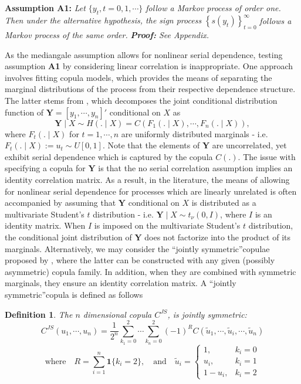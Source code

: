 \documentclass[harvard,11pt]{article}
\newtheorem{definition}{Definition}
\begin{document}
\noindent \textbf{Assumption A1: }\textit{Let $\{y_t,t=0,1,\cdots\}$ follow a Markov process of order one. Then under the alternative hypothesis, the sign process }$\left\{
s(y_{t})\right\} _{t=0}^{\infty }$\textit{ follows a Markov process of the same order.}\newline
\noindent\textit{\textbf{Proof:} See Appendix.}

As the mediangale assumption allows for nonlinear serial dependence, testing assumption \textbf{A1} by considering linear correlation is inappropriate. One approach involves fitting copula models, which provides the means of separating the marginal distributions of the process from their respective dependence structure. The latter stems from \citet{sklar1959fonctions}, which decomposes the joint conditional distribution function of $\bm{Y}=[y_1,\cdots,y_n]'$ conditional on $X$ as
\[
\bm{Y}\mid X \sim H(.\mid X)=C\left(F_1(.\mid X),\cdots,F_n(.\mid X)\right),
\] 
where $F_t(.\mid X)$ for $t=1,\cdots,n$ are uniformly distributed marginals - i.e. $F_t(.\mid X):= u_t\sim U[0,1]$. Note that the elements of $\bm{Y}$ are uncorrelated, yet exhibit serial dependence which is captured by the copula $C(.)$. The issue with specifying a copula for $\bm{Y}$ is that the no serial correlation assumption implies an identity correlation matrix. As a result, in the literature, the means of allowing for nonlinear serial dependence for processes which are linearly unrelated is often accompanied by assuming that $\bm{Y}$ conditional on $X$ is distributed as a multivariate Student's $t$ distribution - i.e. $\bm{Y}\mid X\sim t_{\nu}(0,I)$, where $I$ is an identity matrix. When $I$ is imposed on the multivariate Student's $t$ distribution, the conditional joint distribution of $\bm{Y}$ does not factorize into the product of its marginals. Alternatively, we may consider the \textquotedblleft jointly symmetric\textquotedblright copulae proposed by \citet{oh2016high}, where the latter can be constructed with any given (possibly asymmetric) copula family. In addition, when they are combined with symmetric marginals, they ensure an identity correlation matrix. A \textquotedblleft jointly symmetric\textquotedblright copula is defined as follows
\begin{definition}
The $n$ dimensional copula $C^{JS}$, is jointly symmetric:
\[
C^{JS}\left(u_1,\cdots,u_n\right)=\frac{1}{2^n}\sum\limits_{k_1=0}^{2}\cdots\sum\limits_{k_n=0}^{2}\left(-1\right)^R C(\tilde{u}_1,\cdots,\tilde{u}_i,\cdots,\tilde{u}_n)
\] 
\[
\text{where}\quad R=\sum\limits_{i=1}^n\bm{1}\{k_i=2\},\quad\text{and}\quad\tilde{u}_i=
\begin{cases}
1,& k_i=0\\
u_i,&k_i=1\\
1-u_i,& k_i=2
\end{cases}
\]
 \end{definition}
\end{document}
